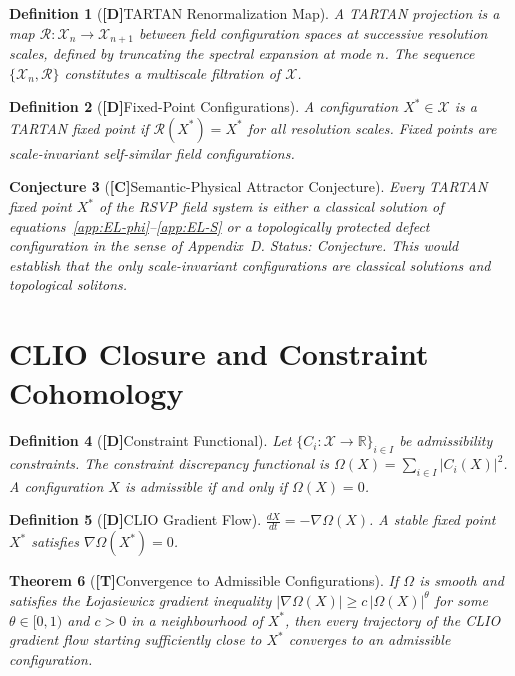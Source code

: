 \documentclass[12pt,a4paper]{article}
\newcommand{\claimD}{\textbf{[D]}\;}
\newcommand{\claimT}{\textbf{[T]}\;}
\newcommand{\claimC}{\textbf{[C]}\;}
\newtheorem{defn}{Definition}[section]
\newtheorem{appconj}[defn]{Conjecture}
\newtheorem{appthm}[defn]{Theorem}
\begin{document}
\begin{defn}[\claimD TARTAN Renormalization Map]
A \emph{TARTAN projection} is a map
$\mathcal{R}: \mathcal{X}_n \to \mathcal{X}_{n+1}$
between field configuration spaces at successive resolution scales, defined by
truncating the spectral expansion at mode $n$. The sequence
$\{\mathcal{X}_n, \mathcal{R}\}$ constitutes a multiscale filtration of
$\mathcal{X}$.
\end{defn}

\begin{defn}[\claimD Fixed-Point Configurations]
A configuration $X^\ast \in \mathcal{X}$ is a \emph{TARTAN fixed point} if
$\mathcal{R}(X^\ast) = X^\ast$ for all resolution scales. Fixed points are
scale-invariant self-similar field configurations.
\end{defn}

\begin{appconj}[\claimC Semantic-Physical Attractor Conjecture]
Every TARTAN fixed point $X^\ast$ of the RSVP field system is either a
classical solution of equations~\eqref{app:EL-phi}--\eqref{app:EL-S}
or a topologically protected defect configuration in the sense of Appendix~D.
\emph{Status: Conjecture.} This would establish that the only scale-invariant
configurations are classical solutions and topological solitons.
\end{appconj}

\section{CLIO Closure and Constraint Cohomology}

\begin{defn}[\claimD Constraint Functional]
Let $\{C_i: \mathcal{X}\to\mathbb{R}\}_{i\in I}$ be admissibility constraints.
The constraint discrepancy functional is
$\Omega(X) = \sum_{i\in I} |C_i(X)|^2$.
A configuration $X$ is admissible if and only if $\Omega(X) = 0$.
\end{defn}

\begin{defn}[\claimD CLIO Gradient Flow]
$\frac{dX}{dt} = -\nabla\Omega(X)$.
A stable fixed point $X^\ast$ satisfies $\nabla\Omega(X^\ast) = 0$.
\end{defn}

\begin{appthm}[\claimT Convergence to Admissible Configurations]
If $\Omega$ is smooth and satisfies the Łojasiewicz gradient inequality
$|\nabla\Omega(X)| \geq c\,|\Omega(X)|^\theta$ for some $\theta\in[0,1)$
and $c>0$ in a neighbourhood of $X^\ast$, then every trajectory of the
CLIO gradient flow starting sufficiently close to $X^\ast$ converges to
an admissible configuration.
\end{appthm}
\end{document}
